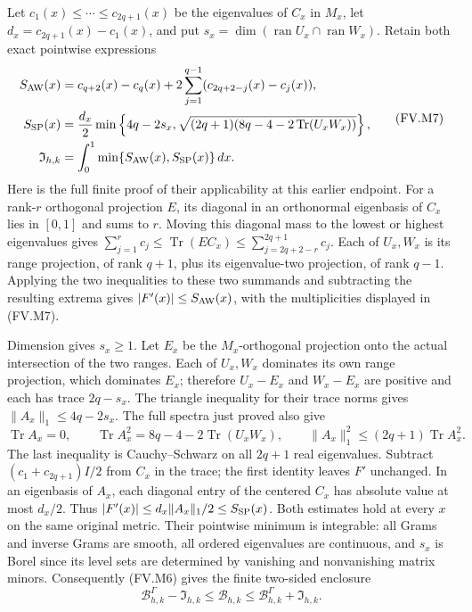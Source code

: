 Let $c_1(x)\le\cdots\le c_{2q+1}(x)$ be the eigenvalues of $C_x$
in $M_x$, let $d_x=c_{2q+1}(x)-c_1(x)$, and put
$s_x=\dim(\operatorname{ran}U_x\cap\operatorname{ran}W_x)$.
Retain both exact pointwise expressions
\[
 \begin{aligned}
 S_{\rm AW}(x)&=c_{q+2}(x)-c_q(x)
       +2\sum_{j=1}^{q-1}(c_{2q+2-j}(x)-c_j(x)),\\
 S_{\rm SP}(x)&=\frac{d_x}{2}\min\left\{4q-2s_x,
 \sqrt{(2q+1)(8q-4-2\operatorname{Tr}(U_xW_x))}\right\},\\
 \mathfrak I_{h,k}&=\int_0^1\min\{S_{\rm AW}(x),S_{\rm SP}(x)\}\,dx.
 \end{aligned}\tag{FV.M7}\label{fvmetric:control}
\]
Here is the full finite proof of their applicability at this earlier
endpoint. For a rank-$r$ orthogonal projection $E$, its diagonal in an
orthonormal eigenbasis of $C_x$ lies in $[0,1]$ and sums to $r$.
Moving this diagonal mass to the lowest or highest eigenvalues gives
$\sum_{j=1}^r c_j\le\operatorname{Tr}(EC_x)
\le\sum_{j=2q+2-r}^{2q+1}c_j$.
Each of $U_x,W_x$ is its range projection, of rank $q+1$, plus its
eigenvalue-two projection, of rank $q-1$. Applying the two inequalities
to these two summands and subtracting the resulting extrema gives
$|F'(x)|\le S_{\rm AW}(x)$, with the multiplicities displayed in
(FV.M7).

Dimension gives $s_x\ge1$. Let $E_x$ be the $M_x$-orthogonal
projection onto the actual intersection of the two ranges. Each of
$U_x,W_x$ dominates its own range projection, which dominates $E_x$;
therefore $U_x-E_x$ and $W_x-E_x$ are positive and each has trace
$2q-s_x$. The triangle inequality for their trace norms gives
$\|A_x\|_1\le4q-2s_x$.
The full spectra just proved also give
\[
 \operatorname{Tr}A_x=0,\qquad
 \operatorname{Tr}A_x^2=8q-4-2\operatorname{Tr}(U_xW_x),\qquad
 \|A_x\|_1^2\le(2q+1)\operatorname{Tr}A_x^2.
 \tag{FV.M8}\label{fvmetric:overlap}
\]
The last inequality is Cauchy--Schwarz on all $2q+1$ real
eigenvalues. Subtract $(c_1+c_{2q+1})I/2$ from $C_x$ in the trace;
the first identity leaves $F'$ unchanged. In an eigenbasis of $A_x$,
each diagonal entry of the centered $C_x$ has absolute value at most
$d_x/2$. Thus $|F'(x)|\le d_x\|A_x\|_1/2\le S_{\rm SP}(x)$.
Both estimates hold at every $x$ on the same original metric. Their
pointwise minimum is integrable: all Grams and inverse Grams are smooth,
all ordered eigenvalues are continuous, and $s_x$ is Borel since its
level sets are determined by vanishing and nonvanishing matrix minors.
Consequently (FV.M6) gives the finite two-sided enclosure
\[
 \boxed{\mathcal B^\Gamma_{h,k}-\mathfrak I_{h,k}
       \le\mathcal B_{h,k}\le
        \mathcal B^\Gamma_{h,k}+\mathfrak I_{h,k}.}
 \tag{FV.M9}\label{fvmetric:budget}
\]

